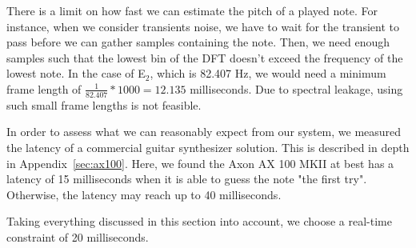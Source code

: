 \documentclass[a4paper,10pt,twocolumn]{article}
\newcommand{\note}[2]{#1${}_{#2}$}
\begin{document}
There is a limit on how fast we can estimate the pitch of a played note. For instance, when we consider transients noise, we have to wait for the transient to pass before we can gather samples containing the note. Then, we need enough samples such that the lowest bin of the DFT doesn't exceed the frequency of the lowest note. In the case of \note{E}{2}, which is 82.407 Hz, we would need a minimum frame length of $ \frac{1}{82.407} * 1000 = 12.135 $ milliseconds. Due to spectral leakage, using such small frame lengths is not feasible. %

In order to assess what we can reasonably expect from our system, we measured the latency of a commercial guitar synthesizer solution. This is described in depth in Appendix~\ref{sec:ax100}. Here, we found the Axon AX 100 MKII at best has a latency of 15 milliseconds when it is able to guess the note "the first try". Otherwise, the latency may reach up to 40 milliseconds.


Taking everything discussed in this section into account, we choose a real-time constraint of 20 milliseconds.



\end{document}
